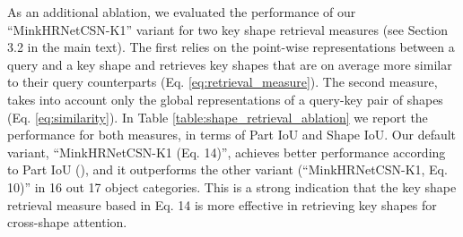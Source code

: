 \documentclass{egpubl}
\begin{document}
As an additional ablation, we evaluated the performance of our 
``MinkHRNetCSN-K1'' variant for two key shape retrieval measures (see Section 3.2 in the main text). 
The first relies on the point-wise  representations between a query and a key shape and retrieves key
shapes that are on average  more similar to their query counterparts (Eq. \ref{eq:retrieval_measure}). 
The second  measure, takes into account only the global representations of a query-key pair of shapes
(Eq. \ref{eq:similarity}). In Table \ref{table:shape_retrieval_ablation} we report the performance for
both measures, in terms of Part IoU and Shape IoU. Our default variant, ``MinkHRNetCSN-K1 (Eq. 14)'',
achieves  better performance according to Part IoU (), and it outperforms the other variant (``MinkHRNetCSN-K1, Eq. 10)'' in 16 out 17 object 
categories. This is a strong indication that the key shape retrieval
measure based in Eq. 14 is more effective in retrieving key shapes for
cross-shape attention.
  
\end{document}
